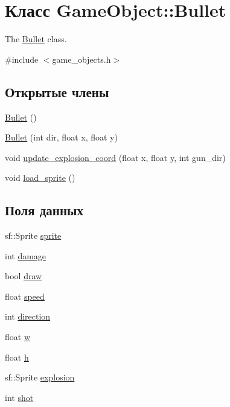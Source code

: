 \hypertarget{classGameObject_1_1Bullet}{}\section{Класс Game\+Object\+:\+:Bullet}
\label{classGameObject_1_1Bullet}


The \hyperlink{classGameObject_1_1Bullet}{Bullet} class.  




{\ttfamily \#include $<$game\+\_\+objects.\+h$>$}

\subsection*{Открытые члены}
\begin{DoxyCompactItemize}
\item 
\hyperlink{classGameObject_1_1Bullet_a38fedbbbe892177fee4b34c2dd9955ec}{Bullet} ()
\item 
\hyperlink{classGameObject_1_1Bullet_a5e93be5fdfe2361c85f08b53cbc14002}{Bullet} (int dir, float x, float y)
\item 
void \hyperlink{classGameObject_1_1Bullet_a68ee8b2d12e43e847b70ace7a95cf833}{update\+\_\+explosion\+\_\+coord} (float x, float y, int gun\+\_\+dir)
\item 
void \hyperlink{classGameObject_1_1Bullet_afd9561c0d310ff22205dc5c63f9cda56}{load\+\_\+sprite} ()
\end{DoxyCompactItemize}
\subsection*{Поля данных}
\begin{DoxyCompactItemize}
\item 
sf\+::\+Sprite \hyperlink{classGameObject_1_1Bullet_a5e219ab143176814c91e1064c495551b}{sprite}
\item 
int \hyperlink{classGameObject_1_1Bullet_a859aff17279d7d762ff8fd6a89372ae4}{damage}
\item 
bool \hyperlink{classGameObject_1_1Bullet_acfafc84be2b90c0bd0a5a0161c7e55ee}{draw}
\item 
float \hyperlink{classGameObject_1_1Bullet_af4b107bb1ed2e8c5d98b3322be75e6dc}{speed}
\item 
int \hyperlink{classGameObject_1_1Bullet_ab957f45f5450884b8aaca05104305b4a}{direction}
\item 
float \hyperlink{classGameObject_1_1Bullet_a1f1402d7e00dcb529b443be5250cde13}{w}
\item 
float \hyperlink{classGameObject_1_1Bullet_adb6e34303c0f92ee177e1855bc2a3ea7}{h}
\item 
sf\+::\+Sprite \hyperlink{classGameObject_1_1Bullet_a77557b33ad1f1879683a0ff89b9bdd76}{explosion}
\item 
int \hyperlink{classGameObject_1_1Bullet_a447b3ab4306b065be824f9ecc1ddf5bf}{shot}
\end{DoxyCompactItemize}


